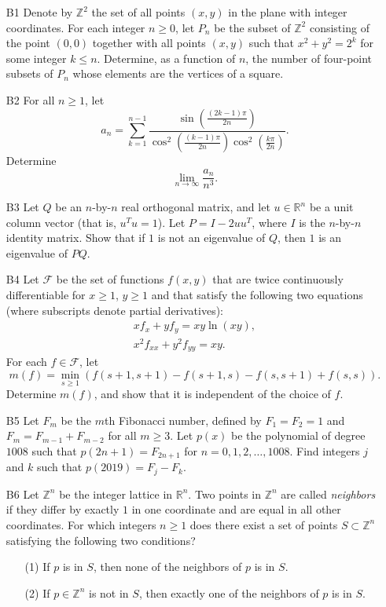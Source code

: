 \documentclass[amssymb,twocolumn,pra,10pt,aps]{revtex4-1}
\begin{document}
\begin{itemize}
\item[B1]
Denote by $\mathbb{Z}^2$ the set of all points $(x,y)$ in the plane with integer coordinates. For each integer $n \geq 0$, let $P_n$ be the subset of $\mathbb{Z}^2$ consisting of the point $(0,0)$ together with all points $(x,y)$ such that $x^2 + y^2 = 2^k$ for some integer $k \leq n$. Determine, as a function of $n$, the number of four-point subsets of $P_n$ whose elements are the vertices of a square.

\item[B2]
For all $n \geq 1$, let
\[
a_n = \sum_{k=1}^{n-1} \frac{\sin \left( \frac{(2k-1)\pi}{2n} \right)}{\cos^2 \left( \frac{(k-1)\pi}{2n} \right) \cos^2 \left( \frac{k\pi}{2n} \right)}.
\]
Determine
\[
\lim_{n \to \infty} \frac{a_n}{n^3}.
\]

\item[B3]
Let $Q$ be an $n$-by-$n$ real orthogonal matrix, and let $u \in \mathbb{R}^n$ be a unit column vector (that is,
$u^T u = 1$). Let $P = I - 2uu^T$, where $I$ is the $n$-by-$n$ identity matrix. Show that if $1$ is not an eigenvalue of $Q$, then $1$ is an eigenvalue of $PQ$.

\item[B4]
Let $\mathcal{F}$ be the set of functions $f(x,y)$ that are twice continuously differentiable for $x \geq 1$, $y \geq 1$ and that satisfy the following two equations (where subscripts denote partial derivatives):
\begin{gather*}
xf_x + yf_y = xy \ln(xy), \\
x^2 f_{xx} + y^2 f_{yy} = xy.
\end{gather*}
For each $f \in \mathcal{F}$, let
\[
m(f) = \min_{s \geq 1} \left(f(s+1,s+1) - f(s+1,s) - f(s,s+1) + f(s,s) \right).
\]
Determine $m(f)$, and show that it is independent of the choice of $f$.

\item[B5]
Let $F_m$ be the $m$th Fibonacci number, defined by $F_1 = F_2 = 1$ and $F_m = F_{m-1} + F_{m-2}$ for all $m \geq 3$.
Let $p(x)$ be the polynomial of degree $1008$ such that $p(2n+1) = F_{2n+1}$ for $n=0,1,2,\dots,1008$. Find integers $j$ and $k$ such that $p(2019) = F_j - F_k$.

\item[B6]
Let $\mathbb{Z}^n$ be the integer lattice in $\mathbb{R}^n$. Two points in $\mathbb{Z}^n$ are called 
\emph{neighbors} if they differ by exactly $1$ in one coordinate and are equal in all other coordinates. 
For which integers $n \geq 1$ does there exist a set of points $S \subset \mathbb{Z}^n$ satisfying the following two conditions?
\begin{enumerate}
\item[(1)] If $p$ is in $S$, then none of the neighbors of $p$ is in $S$.
\item[(2)] If $p \in \mathbb{Z}^n$ is not in $S$, then exactly one of the neighbors of $p$ is in $S$.
\end{enumerate}
\end{itemize}
\end{document}
